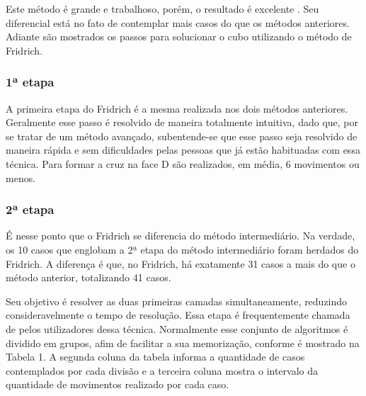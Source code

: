 Este método é grande e trabalhoso, porém, o resultado é excelente \cite{renann}. Seu diferencial está no fato de contemplar mais casos do que os métodos anteriores. Adiante são mostrados os passos para solucionar o cubo utilizando o método de Fridrich.

\subsubsection{1ª etapa}

A primeira etapa do Fridrich é a mesma realizada nos dois métodos anteriores. Geralmente esse passo é resolvido de maneira totalmente intuitiva, dado que, por se tratar de um método avançado, subentende-se que esse passo seja resolvido de maneira rápida e sem dificuldades pelas pessoas que já estão habituadas com essa técnica. Para formar a cruz na face D são realizados, em média, 6 movimentos ou menos.


\subsubsection{2ª etapa}


É nesse ponto que o Fridrich se diferencia do método intermediário. Na verdade, os 10 casos que englobam a 2ª etapa do método intermediário foram herdados do Fridrich. A diferença é que, no Fridrich, há exatamente 31 casos a mais do que o método anterior, totalizando 41 casos.

Seu objetivo é resolver as duas primeiras camadas simultaneamente, reduzindo consideravelmente o tempo de resolução. Essa etapa é frequentemente chamada de pelos utilizadores dessa técnica. Normalmente esse conjunto de algoritmos é dividido em grupos, afim de facilitar a sua memorização, conforme é mostrado na Tabela 1. A segunda coluna da tabela informa a quantidade de casos contemplados por cada divisão e a terceira coluna mostra o intervalo da quantidade de movimentos realizado por cada caso.


